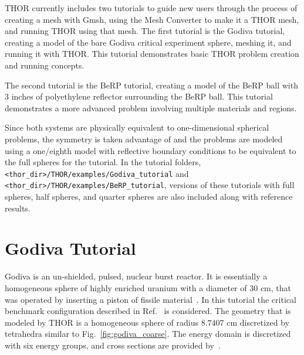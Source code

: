 \ac{THOR} currently includes two tutorials to guide new users through the process of creating a mesh with Gmsh, using the Mesh Converter to make it a \ac{THOR} mesh, and running \ac{THOR} using that mesh.
The first tutorial is the Godiva tutorial, creating a model of the bare Godiva critical experiment sphere, meshing it, and running it with \ac{THOR}.
This tutorial demonstrates basic \ac{THOR} problem creation and running concepts.

The second tutorial is the BeRP tutorial, creating a model of the BeRP ball with 3 inches of polyethylene reflector surrounding the BeRP ball.
This tutorial demonstrates a more advanced problem involving multiple materials and regions.

Since both systems are physically equivalent to one-dimensional spherical problems, the symmetry is taken advantage of and the problems are modeled using a one/eighth model with reflective boundary conditions to be equivalent to the full spheres for the tutorial.
In the tutorial folders, \\
\verb"<thor_dir>/THOR/examples/Godiva_tutorial" and \verb"<thor_dir>/THOR/examples/BeRP_tutorial", versions of these tutorials with full spheres, half spheres, and quarter spheres are also included along with reference results.

\section{Godiva Tutorial}

Godiva is an un-shielded, pulsed, nuclear burst reactor. It is essentially a homogeneous sphere of highly enriched uranium with a diameter of $30$ cm, that was operated by inserting a piston of fissile material~\cite{Godiva1961}.
In this tutorial the critical benchmark configuration described in Ref.~\cite{GodivaBenchmark} is considered. The geometry that is modeled by \ac{THOR} is a homogeneous sphere of radius $8.7407$ cm discretized by tetrahedra similar to Fig.~\ref{fig:godiva_coarse}.
The energy domain is discretized with six energy groups, and cross sections are provided by~\cite{GodivaBenchmark}.

